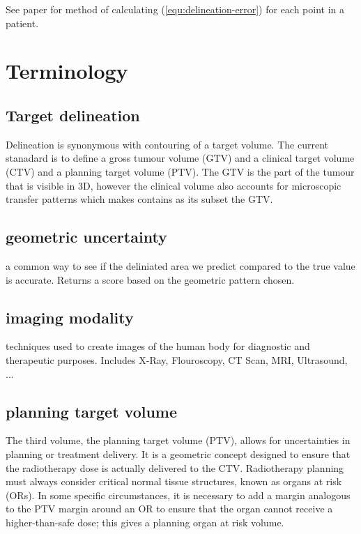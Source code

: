 \documentclass[11pt]{article}
\begin{document}
See paper for method of calculating (\ref{equ:delineation-error}) for each point in a patient.

\section{Terminology}

\subsection{Target delineation} \label{term:target-delineation}

Delineation is synonymous with contouring of a target volume. The current stanadard is to define a gross tumour volume (GTV) and a clinical target volume (CTV) and a planning target volume (PTV). The GTV is the part of the tumour that is visible in 3D, however the clinical volume also accounts for microscopic transfer patterns which makes contains as its subset the GTV\cite{tumor-delineation}.

\subsection{geometric uncertainty} \label{term:geometric-uncertainty}

a common way to see if the deliniated area we predict compared to the true value is accurate. Returns a score based on the geometric pattern chosen\cite{review-metrics}.

\subsection{imaging modality} \label{term:imaging-modality}

techniques used to create images of the human body for diagnostic and therapeutic purposes. Includes X-Ray, Flouroscopy, CT Scan, MRI, Ultrasound, ...\cite{imaging-modality}

\subsection{planning target volume} \label{term:planning-target-volume}

The third volume, the planning target volume (PTV), allows for uncertainties in planning or treatment delivery. It is a geometric concept designed to ensure that the radiotherapy dose is actually delivered to the CTV. Radiotherapy planning must always consider critical normal tissue structures, known as organs at risk (ORs). In some specific circumstances, it is necessary to add a margin analogous to the PTV margin around an OR to ensure that the organ cannot receive a higher-than-safe dose; this gives a planning organ at risk volume. \cite{defining-target-volumes}

\printbibliography
\end{document}
